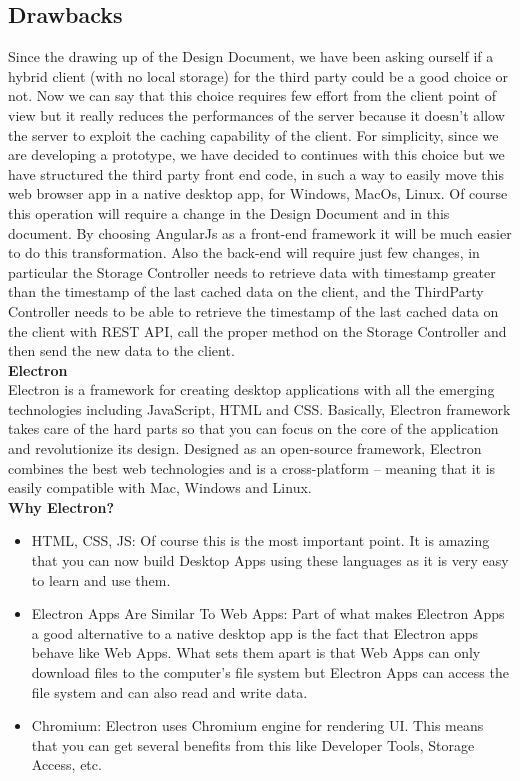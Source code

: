 \subsection{Drawbacks}
Since the drawing up of the Design Document, we have been asking ourself if a hybrid client (with no local storage) for the third party could be a good choice or not. Now we can say that this choice requires few effort from the client point of view but it really reduces the performances of the server because it doesn't allow the server to exploit the caching capability of the client.
For simplicity, since we are developing a prototype, we have decided to continues with this choice but we have structured the third party front end code, in such a way to easily move this web browser app in a native desktop app, for Windows, MacOs, Linux. Of course this operation will require a change in the Design Document and in this document.
By choosing AngularJs as a front-end framework it will be much easier to do this transformation. Also the back-end will require just few changes, in particular the Storage Controller needs to retrieve data with timestamp greater than the timestamp of the last cached data on the client, and the ThirdParty Controller needs to be able to retrieve the timestamp of the last cached data on the client with REST API, call the proper method on the Storage Controller and then send the new data to the client.\\

\textbf{Electron}\\

Electron is a framework for creating desktop applications with all the emerging technologies including JavaScript, HTML and CSS. Basically, Electron framework takes care of the hard parts so that you can focus on the core of the application and revolutionize its design.
Designed as an open-source framework, Electron combines the best web technologies and is a cross-platform – meaning that it is easily compatible with Mac, Windows and Linux.\\

\textbf{Why Electron?}
\begin{itemize}
\item HTML, CSS, JS: Of course this is the most important point. It is amazing that you can now build Desktop Apps using these languages as it is very easy to learn and use them.
\item Electron Apps Are Similar To Web Apps: Part of what makes Electron Apps a good alternative to a native desktop app is the fact that Electron apps behave like Web Apps. What sets them apart is that Web Apps can only download files to the computer’s file system but Electron Apps can access the file system and can also read and write data.
\item Chromium: Electron uses Chromium engine for rendering UI. This means that you can get several benefits from this like Developer Tools, Storage Access, etc.
\end{itemize}